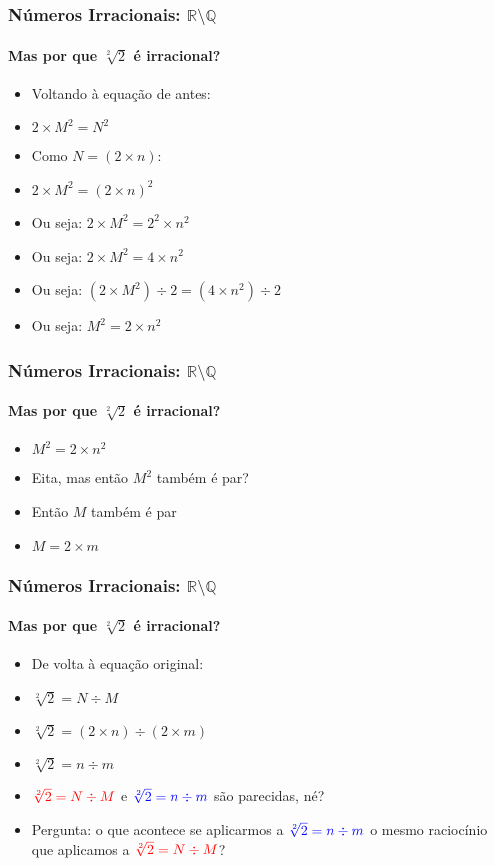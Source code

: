 \documentclass[usenames,dvipsnames,svgnames]{beamer}
\begin{document}
\begin{frame}
	
	\frametitle{Números Irracionais: $\mathbb{R} \setminus \mathbb{Q}$}
	\framesubtitle{Mas {\color{red}por que} $\sqrt[2]{2}$ é irracional?}

	\begin{itemize}
		\item Voltando à equação de antes:
		\item $2 \times M^2 = N^2$
		\item Como $N = (2 \times n)$:
		\item $2 \times M^2 = (2 \times n)^2$
		\item Ou seja: $2 \times M^2 = 2^2 \times n^2$
		\item Ou seja: $2 \times M^2 = 4 \times n^2$
		\item Ou seja: $(2 \times M^2) \div 2 = (4 \times n^2) \div 2$
		\item Ou seja: $M^2 = 2 \times n^2$
	\end{itemize}

\end{frame}

\begin{frame}
	
	\frametitle{Números Irracionais: $\mathbb{R} \setminus \mathbb{Q}$}
	\framesubtitle{Mas {\color{red}por que} $\sqrt[2]{2}$ é irracional?}

	\begin{itemize}
		\item $M^2 = 2 \times n^2$
		\item Eita, mas então $M^2$ também é par?
		\item Então $M$ também é par
		\item $M = 2 \times m$
	\end{itemize}

\end{frame}

\begin{frame}
	
	\frametitle{Números Irracionais: $\mathbb{R} \setminus \mathbb{Q}$}
	\framesubtitle{Mas {\color{red}por que} $\sqrt[2]{2}$ é irracional?}

	\begin{itemize}
		\item De volta à equação original:
		\item $\sqrt[2]{2} = N \div M$
		\item $\sqrt[2]{2} = (2 \times n) \div (2 \times m)$
		\item $\sqrt[2]{2} = n \div m$
		\item ${\color{red}\sqrt[2]{2} = N \div M}$ e ${\color{blue}\sqrt[2]{2} = n \div m}$ são parecidas, né?
		\item Pergunta: o que acontece se aplicarmos a ${\color{blue}\sqrt[2]{2} = n \div m}$ o mesmo raciocínio que aplicamos a ${\color{red}\sqrt[2]{2} = N \div M}$?
	\end{itemize}

\end{frame}
\end{document}
